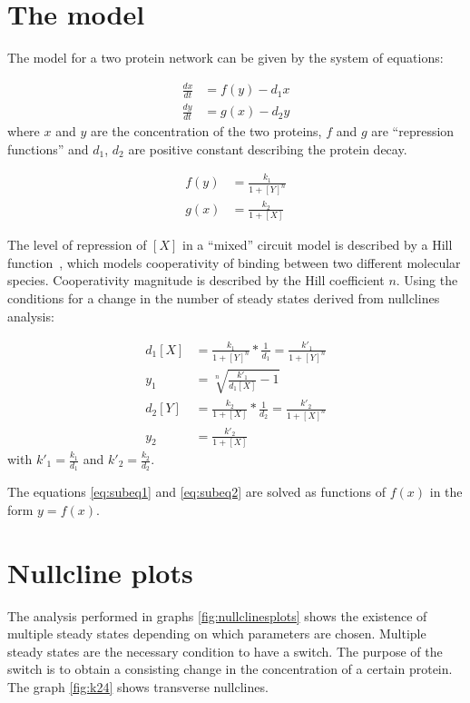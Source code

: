 \newcommand{\package}{\emph}
\section{The model}
The model for a two protein network can be given by the system of equations:

\begin{subequations}
	\begin{align}
		\frac{dx}{dt} &= f(y) - d_1 x \\
		\frac{dy}{dt} &= g(x) - d_2 y
	\end{align}
\end{subequations}
where $x$ and $y$ are the concentration of the two proteins, $f$ and $g$ are
``repression functions'' and $d_1$, $d_2$ are positive constant describing
the protein decay.

\begin{subequations}
	\begin{align}
		f(y) &= \frac{k_1}{1+[Y]^n} \\
		g(x) &= \frac{k_2}{1+[X]} 
	\end{align}
\end{subequations}

The level of repression of $[X]$ in a ``mixed'' circuit model is described by a
Hill function~\citep{CHERRY2000117}, which models cooperativity of
binding between two different molecular species. Cooperativity magnitude is described by the Hill coefficient
$n$. Using the conditions for a change in the number of steady states derived
from nullclines analysis:


\begin{subequations}
	\begin{align}
		d_1 [X] &= \frac{k_1}{1+[Y]^n}*\frac{1}{d_1} = \frac{k'_1}{1+[Y]^n}
		\label{eq:subeq1}\\ 
		y_1 &= \sqrt[n]{\frac{k'_1}{d_1 [X]}-1}\\
		d_2[Y] &= \frac{k_2}{1+[X]}*\frac{1}{d_2} = \frac{k'_2}{1+[X]^n}\\
		y_2 &= \frac{k'_2}{1+[X]} \label{eq:subeq2}
	\end{align}
\end{subequations}
with $k'_1 = \frac{k_1}{d_1}$  and $k'_2 = \frac{k_2}{d_2}$.

The equations \ref{eq:subeq1} and \ref{eq:subeq2} are solved as functions of
$f(x)$ in the form $y = f(x)$.

\section{Nullcline plots}
The analysis performed in graphs \ref{fig:nullclinesplots} shows the existence
of multiple steady states depending on which parameters are chosen. Multiple
steady states are the necessary condition to have a switch. The purpose of the
switch is to obtain a consisting change in the concentration of a certain
protein. The graph \ref{fig:k24} shows  transverse nullclines.

